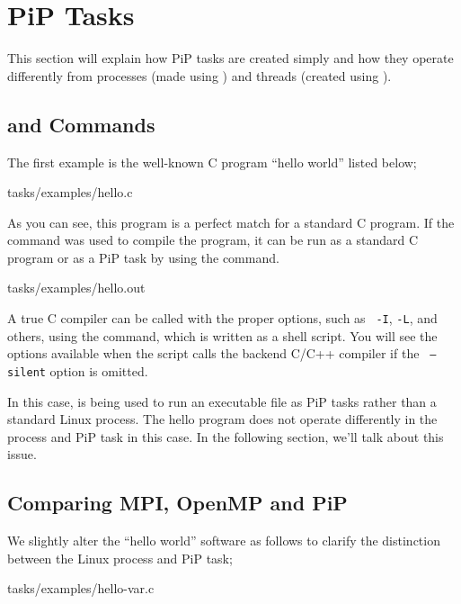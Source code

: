 
\section{PiP Tasks}

This section will explain how PiP tasks are created simply and how
they operate differently from processes (made using ) and
threads (created using ).

\subsection{ and  Commands}
\label{sec:pipcc-exec}

The first example is  the well-known C program ``hello world'' listed
below; 

 {tasks/examples/hello.c}

As you can see, this program is a perfect match for a standard C
program. If the  command was used to compile the
program, it can be run as a standard C program or as a PiP task by
using the  command.


                {tasks/examples/hello.out}

A true C compiler can be called with the proper options, such as {\tt
  -I}, {\tt -L}, and others, using the  command, which
is written as a shell script. You will see the options available when
the  script calls the backend C/C++ compiler if the {\tt
  —silent} option is omitted. 

In this case,  is being used to run an executable
file as PiP tasks rather than a standard Linux process.  
The hello program does not operate differently in the process and PiP
task in this case. In the following section, we'll talk about this
issue.

\subsection{Comparing MPI, OpenMP and PiP}

We slightly alter the ``hello world'' software as follows to clarify the
distinction between the Linux process and PiP task;

 {tasks/examples/hello-var.c}

